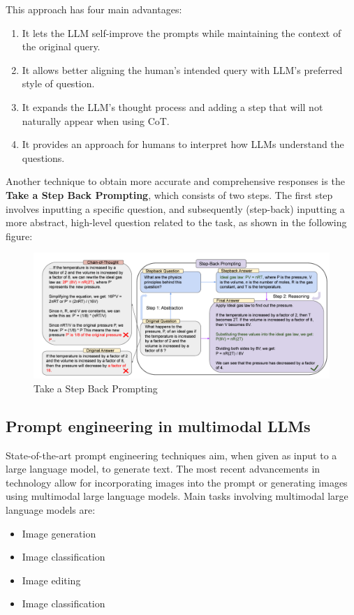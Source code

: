 This approach has four main advantages:
\begin{enumerate}
    \item It lets the LLM self-improve the prompts while maintaining the context of the original query.

    \item It allows better aligning the human’s intended query with LLM’s preferred style of question.

    \item It expands the LLM’s thought process and adding a step that will not naturally appear when using CoT.

    \item It provides an approach for humans to interpret how LLMs understand the questions.
\end{enumerate}
Another technique to obtain more accurate and comprehensive responses is the \textbf{Take a Step Back Prompting}\cite{zheng2023take}, which consists of two steps. The first step involves inputting a specific question, and subsequently (step-back) inputting a more abstract, high-level question related to the task, as shown in the following figure:
\begin{figure}[H]
    \centering
    \includegraphics[width=0.9\linewidth]{Figures/fig_9.png}
    \caption{Take a Step Back Prompting}
    \label{fig:enter-label}
\end{figure}

\subsection{Prompt engineering in multimodal LLMs}
State-of-the-art prompt engineering techniques aim, when given as input to a large language model, to generate text. The most recent advancements in technology allow for incorporating images into the prompt or generating images using multimodal large language models. 
Main tasks involving multimodal large language models are:
\begin{itemize}
    \item Image generation
    \item Image classification
    \item Image editing
    \item Image classification
\end{itemize}


